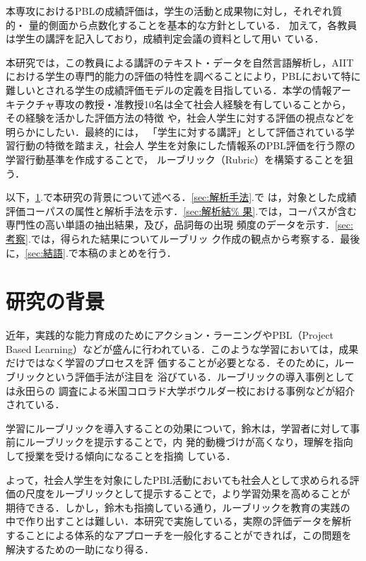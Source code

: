 \documentclass[submit]{ipsj}
\begin{document}
本専攻におけるPBLの成績評価は，学生の活動と成果物に対し，それぞれ質的・
量的側面から点数化することを基本的な方針としている\cite{加藤由花:2009}．
加えて，各教員は学生の講評を記入しており，成績判定会議の資料として用い
ている．

本研究では，この教員による講評のテキスト・データを自然言語解析し，AIIT
における学生の専門的能力の評価の特性を調べることにより，PBLにおいて特に
難しいとされる学生の成績評価モデルの定義を目指している．本学の情報アー
キテクチャ専攻の教授・准教授10名は全て社会人経験を有していることから，
その経験を活かした評価方法の特徴
や，社会人学生に対する評価の視点などを明らかにしたい．最終的には，
「学生に対する講評」として評価されている学習行動の特徴を踏まえ，社会人
学生を対象にした情報系のPBL評価を行う際の学習行動基準を作成することで，
ルーブリック（Rubric）を構築することを狙う．

以下，\ref{sec:背景}.で本研究の背景について述べる．\ref{sec:解析手法}.で
は，対象とした成績評価コーパスの属性と解析手法を示す．\ref{sec:解析結%
果}.では，コーパスが含む専門性の高い単語の抽出結果，及び，品詞毎の出現
頻度のデータを示す．\ref{sec:考察}.では，得られた結果についてルーブリッ
ク作成の観点から考察する．最後に，\ref{sec:結語}.で本稿のまとめを行う．

\section{研究の背景}\label{sec:背景}
近年，実践的な能力育成のためにアクション・ラーニングやPBL（Project
Based Learning）などが盛んに行われている\cite{松澤芳昭:2007,松澤芳%
昭:2008}．このような学習においては，成果だけではなく学習のプロセスを評
価することが必要となる．そのために，ルーブリックという評価手法が注目を
浴びている．ルーブリックの導入事例としては永田ら\cite{永田智子:2003}の
調査による米国コロラド大学ボウルダー校における事例などが紹介されている．

学習にルーブリックを導入することの効果について，鈴木\cite{鈴木雅%
之:2011-12-20}は，学習者に対して事前にルーブリックを提示することで，内
発的動機づけが高くなり，理解を指向して授業を受ける傾向になることを指摘
している．

よって，社会人学生を対象にしたPBL活動においても社会人として求められる評
価の尺度をルーブリックとして提示することで，より学習効果を高めることが
期待できる．しかし，鈴木も指摘している通り，ルーブリックを教育の実践の
中で作り出すことは難しい．本研究で実施している，実際の評価データを解析
することによる体系的なアプローチを一般化することができれば，この問題を
解決するための一助になり得る．
\end{document}
